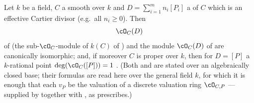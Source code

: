 \begin{lemma}
\label{lem:pc-divisor-line-bundle-agrees-sc}
Let $k$ be a field, $C$ a smooth  over $k$
and $D=\sum_{i=1}^m n_i[P_i]$ a
 of $C$ which is an effective Cartier
divisor (e.g.\ all $n_i\ge0$).  Then
\[
\cO_C(D)
\]
of  (the sub-$\cO_C$-module of $k(C)$
of ) and the module $\cO_C(D)$ of
 are canonically isomorphic; and, if
moreover $C$ is proper over $k$, then for $D=[P]$ a $k$-rational point
$\deg(\cO_C([P]))=1$ .  (Both
 and  are stated
over an algebraically closed base; their formulas are read here over the
general field $k$, for which it is enough that each $v_P$ be the
valuation of a discrete valuation ring $\cO_{C,P}$ --- supplied by
 together with
, as 
prescribes.)
\end{lemma}
